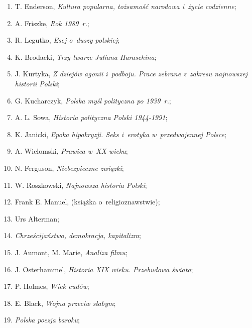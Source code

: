 \documentclass[a4paper,11pt]{article}
\begin{document}
\begin{enumerate}
\item T. Enderson, \textit{Kultura popularna, tożsamość narodowa i~życie
    codzienne};

\item A. Friszke, \textit{Rok 1989~r.};

\item R. Legutko, \textit{Esej o~duszy polskiej};

\item K. Brodacki, \textit{Trzy twarze Juliana Haraschina};

\item J. Kurtyka, \textit{Z dziejów agonii i~podboju. Prace zebrane
    z~zakresu najnowszej historii Polski};

\item G. Kucharczyk, \textit{Polska myśl polityczna po 1939~r.};

\item A. L. Sowa, \textit{Historia polityczna Polski 1944-1991};

\item K. Janicki, \textit{Epoka hipokryzji. Seks i~erotyka
    w~przedwojennej Polsce};

\item A. Wielomski, \textit{Prawica w~XX wieku};

\item N. Ferguson, \textit{Niebezpieczne związki};

\item W. Roszkowski, \textit{Najnowsza historia Polski};

\item Frank E. Manuel, (książka o~religioznawstwie);

\item Urs Alterman;

\item \textit{Chrześcijaństwo, demokracja, kapitalizm};

\item J. Aumont, M. Marie, \textit{Analiza filmu};

\item J. Osterhammel, \textit{Historia XIX wieku. Przebudowa świata};

\item P. Holmes, \textit{Wiek cudów};

\item E. Black, \textit{Wojna przeciw słabym};

\item \textit{Polska poezja baroku};


\end{enumerate}
\end{document}
